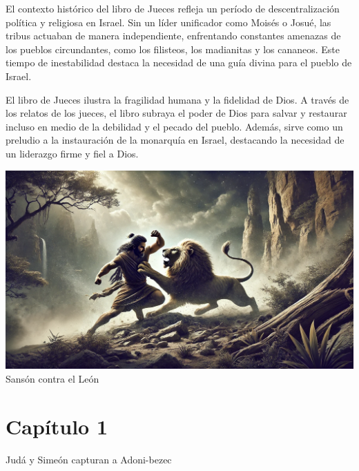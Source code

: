 El contexto histórico del libro de Jueces refleja un período de descentralización política y religiosa en Israel. Sin un líder unificador como Moisés o Josué, las tribus actuaban de manera independiente, enfrentando constantes amenazas de los pueblos circundantes, como los filisteos, los madianitas y los cananeos. Este tiempo de inestabilidad destaca la necesidad de una guía divina para el pueblo de Israel.



El libro de Jueces ilustra la fragilidad humana y la fidelidad de Dios. A través de los relatos de los jueces, el libro subraya el poder de Dios para salvar y restaurar incluso en medio de la debilidad y el pecado del pueblo. Además, sirve como un preludio a la instauración de la monarquía en Israel, destacando la necesidad de un liderazgo firme y fiel a Dios.\\





\begin{center}
	\includegraphics[width=0.7\linewidth]{graficas/jueses}\\
	Sansón contra el León\\
\end{center}


\section*{Capítulo 1}
Judá y Simeón capturan a Adoni-bezec  


